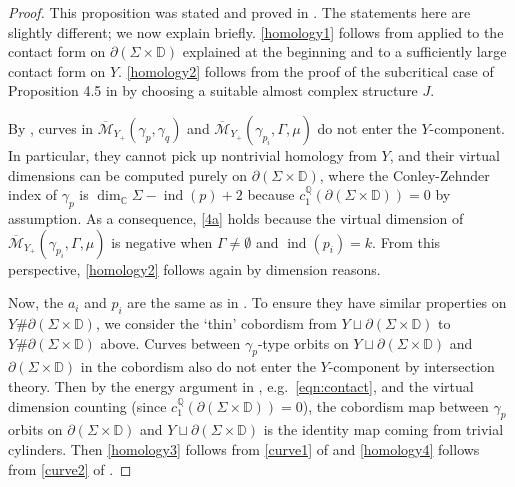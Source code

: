 \documentclass[11pt]{amsart}
\numberwithin{equation}{section}
\def\C{{\mathbb C}}
\def\D{{\mathbb D}}
\def\Q{{\mathbb Q}}
\def\cM{{\mathcal M}}
\DeclareMathOperator{\ind}{ind}
\begin{document}
\begin{proof}
    This proposition was stated and proved in \cite[Proposition 4.5]{bowden2022tight}. The statements here are slightly different; we now explain briefly. \eqref{homology1} follows from  applied to the contact form on $\partial(\Sigma \times \D)$ explained at the beginning and to a sufficiently large contact form on $Y$. \eqref{homology2} follows from the proof of the subcritical case of Proposition 4.5 in \cite{bowden2022tight} by choosing a suitable almost complex structure $J$. 

    By , curves in $\overline{\cM}_{Y_+}(\gamma_p,\gamma_q)$ and $\overline{\cM}_{Y_+}(\gamma_{p_i},\Gamma,\mu)$ do not enter the $Y$-component. In particular, they cannot pick up nontrivial homology from $Y$, and their virtual dimensions can be computed purely on $\partial(\Sigma \times \D)$, where the Conley-Zehnder index of $\gamma_p$ is $\dim_{\C}\Sigma -\ind(p)+2$ because $c^{\Q}_1(\partial(\Sigma\times \D))=0$ by assumption. As a consequence, \eqref{4a} holds because the virtual dimension of $\overline{\cM}_{Y_+}(\gamma_{p_i},\Gamma,\mu)$ is negative when $\Gamma \ne \emptyset$ and $\ind(p_i)=k$.  From this perspective, \eqref{homology2} follows again by dimension reasons. 

    Now, the $a_i$ and $p_i$ are the same as in . To ensure they have similar properties on $Y\#\partial(\Sigma \times \D)$, we consider the `thin' cobordism from $Y\sqcup \partial(\Sigma\times \D)$ to $Y\#\partial(\Sigma \times \D)$ above. Curves between $\gamma_{p}$-type orbits on $Y\sqcup \partial(\Sigma\times \D)$ and $\partial(\Sigma \times \D)$ in the cobordism also do not enter the $Y$-component by intersection theory. Then by the energy argument in \cite[\S 4.2]{+1}, e.g.\ \eqref{eqn:contact}, and the virtual dimension counting (since $c^{\Q}_1(\partial(\Sigma\times \D))=0$), the cobordism map between $\gamma_{p}$ orbits on $\partial(\Sigma\times \D)$ and $Y\sqcup \partial(\Sigma\times \D)$ is the identity map coming from trivial cylinders. Then \eqref{homology3} follows from \eqref{curve1} of  and \eqref{homology4} follows from \eqref{curve2} of .
\end{proof}
\end{document}
